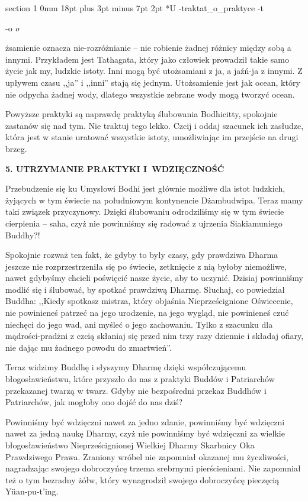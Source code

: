 \documentclass[12pt]{article}
\makeatletter
\renewcommand{\section}{\@startsection%
 {section}			%
 {1}				%
 {0mm}				%
 {18pt plus 3pt minus 7pt}	%
 { 2pt}				%
 {\bfseries}}			%
\newcounter{labelnum}
\newenvironment{Prayer}[4]{%
	\section*{#2}
	\ifx -#1
		\stepcounter{labelnum}\label{label.\arabic{labelnum}}\nopagebreak
	\else
		\label{#1}\nopagebreak
	\fi
	\ifx -#3
		\addcontentsline{toc}{section}{#2}
	\else
		\addcontentsline{toc}{section}{#3}
	\fi
	\ifx -#4
		{}
	\else
		\noindent\emph{#4}\par\nopagebreak
	\fi
	\begingroup
}
{\par\endgroup}
\makeatother
\begin{document}
\begin{Prayer}{traktat_o_praktyce}
Utożsamienie oznacza nie-rozróżnianie -- nie robienie żadnej różnicy między sobą a innymi. Przykładem jest Tathagata, który jako człowiek prowadził takie samo życie jak my, ludzkie istoty. Inni mogą być utożsamiani z ja, a jaźń-ja z innymi. Z upływem czasu ,,ja'' i ,,inni'' stają się jednym. Utożsamienie jest jak ocean, który nie odpycha żadnej wody, dlatego wszystkie zebrane wody mogą tworzyć ocean.


Powyższe praktyki są naprawdę praktyką ślubowania Bodhicitty, spokojnie zastanów się nad tym. Nie traktuj tego lekko. Czcij i oddaj szacunek ich zasłudze, która jest w stanie uratować wszystkie istoty, umożliwiając im przejście na drugi brzeg.


\bigskip
\noindent\textbf{5. UTRZYMANIE PRAKTYKI I~WDZIĘCZNOŚĆ}\par
\medskip

Przebudzenie się ku Umysłowi Bodhi jest głównie możliwe dla istot ludzkich, żyjących w tym świecie na południowym kontynencie Dżambudwipa. Teraz mamy taki związek przyczynowy. Dzięki ślubowaniu odrodziliśmy się w tym świecie cierpienia -- saha, czyż nie powinniśmy się radować z ujrzenia Siakiamuniego Buddhy?!


Spokojnie rozważ ten fakt, że gdyby to były czasy, gdy prawdziwa Dharma jeszcze nie rozprzestrzeniła się po świecie, zetknięcie z nią byłoby niemożliwe, nawet gdybyśmy chcieli poświęcić nasze życie, aby to uczynić. Dzisiaj powinniśmy modlić się i ślubować, by spotkać prawdziwą Dharmę. Słuchaj, co powiedział Buddha: ,,Kiedy spotkasz mistrza, który objaśnia Nieprześcignione Oświecenie, nie powinieneś patrzeć na jego urodzenie, na jego wygląd, nie powinieneś czuć niechęci do jego wad, ani myśleć o jego zachowaniu. Tylko z szacunku dla mądrości-pradżni z czcią skłaniaj się przed nim trzy razy dziennie i składaj ofiary, nie dając mu żadnego powodu do zmartwień''.


Teraz widzimy Buddhę i słyszymy Dharmę dzięki współczującemu błogosławieństwu, które przyszło do nas z praktyki Buddów i Patriarchów przekazanej twarzą w twarz. Gdyby nie bezpośredni przekaz Buddhów i Patriarchów, jak mogłoby ono dojść do nas dziś? 


Powinniśmy być wdzięczni nawet za jedno zdanie, powinniśmy być wdzięczni nawet za jedną naukę Dharmy, czyż nie powinniśmy być wdzięczni za wielkie błogosławieństwo Nieprześcignionej Wielkiej Dharmy Skarbnicy Oka Prawdziwego Prawa. Zraniony wróbel nie zapomniał okazanej mu życzliwości, nagradzając swojego dobroczyńcę trzema srebrnymi pierścieniami. Nie zapomniał też o tym bezradny żółw, który wynagrodził swojego dobroczyńcę pieczęcią Yüan-pu-t'ing. 



\end{Prayer}
\end{document}
